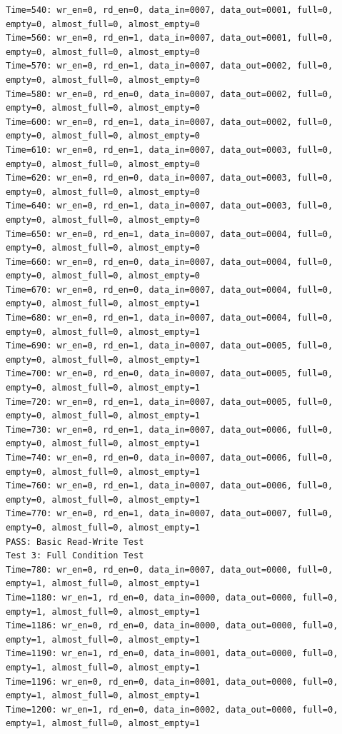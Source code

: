 \documentclass[UTF8]{ctexart}
\begin{document}
\begin{lstlisting}[frame=shadowbox]
Time=540: wr_en=0, rd_en=0, data_in=0007, data_out=0001, full=0, empty=0, almost_full=0, almost_empty=0
Time=560: wr_en=0, rd_en=1, data_in=0007, data_out=0001, full=0, empty=0, almost_full=0, almost_empty=0
Time=570: wr_en=0, rd_en=1, data_in=0007, data_out=0002, full=0, empty=0, almost_full=0, almost_empty=0
Time=580: wr_en=0, rd_en=0, data_in=0007, data_out=0002, full=0, empty=0, almost_full=0, almost_empty=0
Time=600: wr_en=0, rd_en=1, data_in=0007, data_out=0002, full=0, empty=0, almost_full=0, almost_empty=0
Time=610: wr_en=0, rd_en=1, data_in=0007, data_out=0003, full=0, empty=0, almost_full=0, almost_empty=0
Time=620: wr_en=0, rd_en=0, data_in=0007, data_out=0003, full=0, empty=0, almost_full=0, almost_empty=0
Time=640: wr_en=0, rd_en=1, data_in=0007, data_out=0003, full=0, empty=0, almost_full=0, almost_empty=0
Time=650: wr_en=0, rd_en=1, data_in=0007, data_out=0004, full=0, empty=0, almost_full=0, almost_empty=0
Time=660: wr_en=0, rd_en=0, data_in=0007, data_out=0004, full=0, empty=0, almost_full=0, almost_empty=0
Time=670: wr_en=0, rd_en=0, data_in=0007, data_out=0004, full=0, empty=0, almost_full=0, almost_empty=1
Time=680: wr_en=0, rd_en=1, data_in=0007, data_out=0004, full=0, empty=0, almost_full=0, almost_empty=1
Time=690: wr_en=0, rd_en=1, data_in=0007, data_out=0005, full=0, empty=0, almost_full=0, almost_empty=1
Time=700: wr_en=0, rd_en=0, data_in=0007, data_out=0005, full=0, empty=0, almost_full=0, almost_empty=1
Time=720: wr_en=0, rd_en=1, data_in=0007, data_out=0005, full=0, empty=0, almost_full=0, almost_empty=1
Time=730: wr_en=0, rd_en=1, data_in=0007, data_out=0006, full=0, empty=0, almost_full=0, almost_empty=1
Time=740: wr_en=0, rd_en=0, data_in=0007, data_out=0006, full=0, empty=0, almost_full=0, almost_empty=1
Time=760: wr_en=0, rd_en=1, data_in=0007, data_out=0006, full=0, empty=0, almost_full=0, almost_empty=1
Time=770: wr_en=0, rd_en=1, data_in=0007, data_out=0007, full=0, empty=0, almost_full=0, almost_empty=1
PASS: Basic Read-Write Test
Test 3: Full Condition Test
Time=780: wr_en=0, rd_en=0, data_in=0007, data_out=0000, full=0, empty=1, almost_full=0, almost_empty=1
Time=1180: wr_en=1, rd_en=0, data_in=0000, data_out=0000, full=0, empty=1, almost_full=0, almost_empty=1
Time=1186: wr_en=0, rd_en=0, data_in=0000, data_out=0000, full=0, empty=1, almost_full=0, almost_empty=1
Time=1190: wr_en=1, rd_en=0, data_in=0001, data_out=0000, full=0, empty=1, almost_full=0, almost_empty=1
Time=1196: wr_en=0, rd_en=0, data_in=0001, data_out=0000, full=0, empty=1, almost_full=0, almost_empty=1
Time=1200: wr_en=1, rd_en=0, data_in=0002, data_out=0000, full=0, empty=1, almost_full=0, almost_empty=1

\end{lstlisting}
\end{document}
